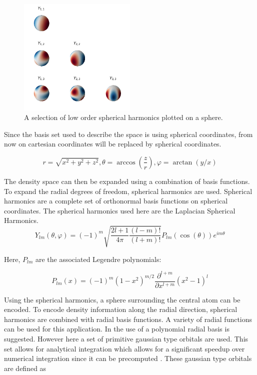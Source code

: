 \begin{figure} [H]
  \centering
  \includegraphics[width=0.5\textwidth]{figures/snap/sph-harm.png} %
  \caption[Spherical harmonics]{A selection of low order spherical harmonics plotted on a sphere. } %
  \label{fig:sphharm}
\end{figure}

Since the basis set used to describe the space is using spherical coordinates, from now on
cartesian coordinates will be replaced by spherical coordinates.

$$
r = \sqrt{x^2 + y^2 + z^2}
,
\theta = \arccos(\frac{z}{r})
,
\varphi = \arctan(y / x)
$$ %

The density space can then be expanded using a combination of basis functions.
To expand the radial degrees of freedom, spherical harmonics are used.
Spherical harmonics are a complete set of orthonormal basis functions on spherical coordinates.
The spherical harmonics used here are the Laplacian Spherical Harmonics.
$$
Y_{lm}(\theta, \varphi) = (-1)^m \sqrt{\frac{2l + 1}{4 \pi} \frac{(l - m)!}{(l + m)!}} P_{lm}\left(\cos(\theta) \right) e^{im\theta}
$$

Here, $P_{lm}$ are the associated Legendre polynomials:

$$
P_{lm}(x) = (-1)^m (1-x^2)^{m/2} \frac{\partial^{l+m}}{\partial x^{l+m}}(x^2 - 1)^l
$$ %



Using the spherical harmonics, a sphere surrounding the central atom can be encoded.
To encode density information along the radial direction, spherical harmonics are combined with radial basis functions.
A variety of radial functions can be used for this application.
In \cite{KUHL1982236} the use of a polynomial radial basis is suggested.
However here a set of primitive gaussian type orbitals are used.
This set allows for analytical integration which allows for a significant speedup over numerical integration since it can be precomputed \cite{dscribe}.
These gaussian type orbitals are defined as


